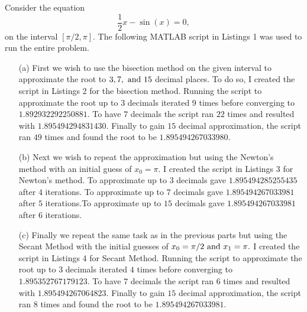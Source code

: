 \documentclass[12pt]{report}
\begin{document}
\begin{solution}

    \noindent
    Consider the equation
    \[ 
        \frac{1}{2}x - \sin(x) = 0,  
    \]
    on the interval $[\pi/2,\pi].$ The following MATLAB script in Listings 1 was used to run the entire problem.

    

    \begin{enumerate}
        \item [(a)]
        First we wish to use the bisection method on the given interval to approximate the root to $3, 7, {~\text{and}~} 15$ decimal places. To do so, I created the script in Listings 2 for the bisection method. Running the script to approximate the root up to $3$ decimals iterated $9$ times before converging to $1.892932292250881$. To have $7$ decimals the script ran $22$ times and resulted with $1.895494294831430$. Finally to gain $15$ decimal approximation, the script ran $49$ times and found the root to be $1.895494267033980$.  
        
        
        
        \item [(b)]
        Next we wish to repeat the approximation but using the Newton's method with an initial guess of $x_0 = \pi$. I created the script in Listings 3 for Newton's method. To approximate up to $3$ decimals gave $1.895494285255435$ after $4$ iterations. To approximate up to $7$ decimals gave $1.895494267033981$ after $5$ iterations.To approximate up to $15$ decimals gave $1.895494267033981$ after $6$ iterations.
        
        

        \item [(c)]
        Finally we repeat the same task as in the previous parts but using the Secant Method with the initial guesses of $x_0 = \pi/2 {~\text{and}~} x_1 = \pi.$ I created the script in Listings 4 for Secant Method. Running the script to approximate the root up to $3$ decimals iterated $4$ times before converging to $1.895352767179123$. To have $7$ decimals the script ran $6$ times and resulted with $1.895494267064823$. Finally to gain $15$ decimal approximation, the script ran $8$ times and found the root to be $1.895494267033981$.

        


    \end{enumerate}
\end{solution}
\end{document}

